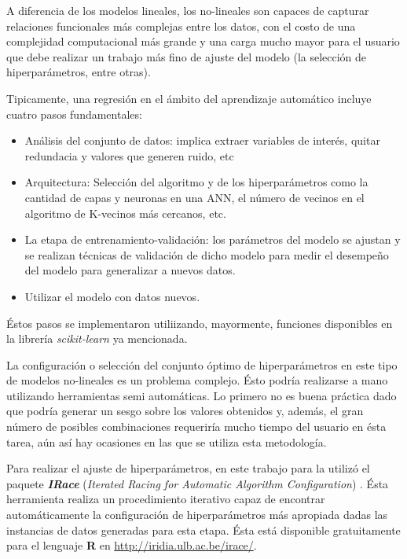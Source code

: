     \par A diferencia de los modelos lineales, los no-lineales son capaces de
      capturar relaciones funcionales más complejas entre los datos, con el costo
      de una complejidad computacional más grande y una carga mucho mayor para el
      usuario que debe realizar un trabajo más fino de ajuste del modelo (la
      selección de hiperparámetros, entre otras).

    \par Tipicamente, una regresión en el ámbito del aprendizaje automático
      incluye cuatro pasos fundamentales:
      \begin{itemize}
        \item Análisis del conjunto de datos: implica extraer variables de interés, quitar redundacia y valores que generen
              ruido, etc
        \item Arquitectura: Selección del algoritmo y de los hiperparámetros como
              la cantidad de capas y neuronas en una ANN, el número de vecinos en
              el algoritmo de K-vecinos más cercanos, etc.
        \item La etapa de entrenamiento-validación: los parámetros del modelo
              se ajustan y se realizan técnicas de validación de dicho modelo para
              medir el desempeño del modelo para generalizar a nuevos datos.
        \item Utilizar el modelo con datos nuevos.
      \end{itemize}
      Éstos pasos se implementaron utiliizando, mayormente, funciones disponibles
      en la librería \textit{scikit-learn} ya mencionada.

    \par La configuración o selección del conjunto óptimo de hiperparámetros
      en este tipo de modelos no-lineales es un problema complejo. Ésto
      podría realizarse a mano utilizando herramientas semi automáticas. Lo primero
      no es buena práctica dado que podría generar un sesgo sobre los valores
      obtenidos y, además, el gran número de posibles combinaciones requeriría
      mucho tiempo del usuario en ésta tarea, aún así hay ocasiones en las
      que se utiliza esta metodología.

    \par Para realizar el ajuste de hiperparámetros, en este trabajo para la
      utilizó el paquete \textbf{\textit{IRace}}
      (\textit{Iterated Racing for Automatic Algorithm Configuration}) \cite{irace}.
      Ésta herramienta realiza un procedimiento iterativo capaz de encontrar
      automáticamente la configuración de hiperparámetros más apropiada
      dadas las instancias de datos generadas para esta etapa.
      Ésta está disponible gratuitamente para el lenguaje \textbf{R} en
      \url{http://iridia.ulb.ac.be/irace/}.

